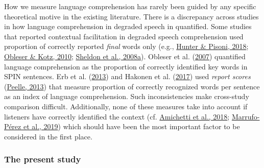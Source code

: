 \documentclass[a4paper, nobind]{templates/ociamthesis}
\begin{document}
\noindent
How we measure language comprehension has rarely been guided by any specific theoretical motive in the existing literature.
There is a discrepancy across studies in how language comprehension in degraded speech in quantified.
Some studies that reported contextual facilitation in degraded speech comprehension used proportion of correctly reported \emph{final} words only (e.g., \protect\hyperlink{ref-Hunter2018}{Hunter \& Pisoni, 2018}; \protect\hyperlink{ref-Obleser2010}{Obleser \& Kotz, 2010}; \protect\hyperlink{ref-Sheldon2008a}{Sheldon et al., 2008a}).
Obleser et al. (\protect\hyperlink{ref-Obleser2007}{2007}) quantified language comprehension as the proportion of correctly identified key words in SPIN sentences.
Erb et al. (\protect\hyperlink{ref-Erb2013}{2013}) and Hakonen et al. (\protect\hyperlink{ref-Hakonen2017}{2017}) used \emph{report scores} (\protect\hyperlink{ref-Peelle2013}{Peelle, 2013}) that measure proportion of correctly recognized words per sentence as an index of language comprehension.
Such inconsistencies make cross-study comparison difficult.
Additionally, none of these measures take into account if listeners have correctly identified the context (cf. \protect\hyperlink{ref-Amichetti2018}{Amichetti et al., 2018}; \protect\hyperlink{ref-Marrufo2019}{Marrufo-Pérez et al., 2019})
which should have been the most important factor to be considered in the first place.

\hypertarget{the-present-study}{%
\subsubsection{The present study}\label{the-present-study}}
\end{document}
